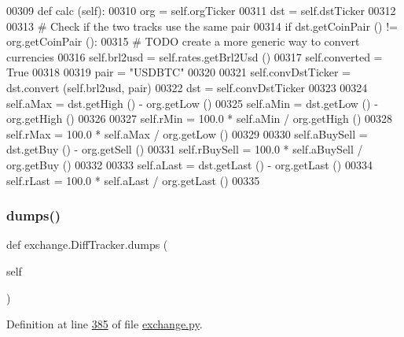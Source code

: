 \begin{DoxyCode}
00309     \textcolor{keyword}{def }calc (self):        
00310         org = self.orgTicker
00311         dst = self.dstTicker 
00312         
00313         \textcolor{comment}{# Check if the two tracks use the same pair}
00314         \textcolor{keywordflow}{if} dst.getCoinPair () != org.getCoinPair ():
00315             \textcolor{comment}{# TODO create a more generic way to convert currencies}
00316             self.brl2usd = self.rates.getBrl2Usd ()
00317             self.converted = \textcolor{keyword}{True} 
00318             
00319             pair = \textcolor{stringliteral}{"USDBTC"}
00320             
00321             self.convDstTicker = dst.convert (self.brl2usd, pair)
00322             dst = self.convDstTicker
00323     
00324         self.aMax = dst.getHigh () - org.getLow ()
00325         self.aMin = dst.getLow () - org.getHigh ()
00326         
00327         self.rMin = 100.0 * self.aMin / org.getHigh ()
00328         self.rMax = 100.0 * self.aMax / org.getLow ()
00329         
00330         self.aBuySell  = dst.getBuy () - org.getSell ()
00331         self.rBuySell = 100.0 * self.aBuySell / org.getBuy ()
00332         
00333         self.aLast = dst.getLast () - org.getLast ()
00334         self.rLast = 100.0 * self.aLast / org.getLast ()
00335    
\end{DoxyCode}
\mbox{\label{classexchange_1_1_diff_tracker_aa3c9d92dbe7c7fcf25959fe55c6ba47d}} 
\subsubsection{\texorpdfstring{dumps()}{dumps()}}
{\footnotesize\ttfamily def exchange.\+Diff\+Tracker.\+dumps (\begin{DoxyParamCaption}\item[{}]{self }\end{DoxyParamCaption})}



Definition at line \hyperlink{exchange_8py_source_l00385}{385} of file \hyperlink{exchange_8py_source}{exchange.\+py}.



